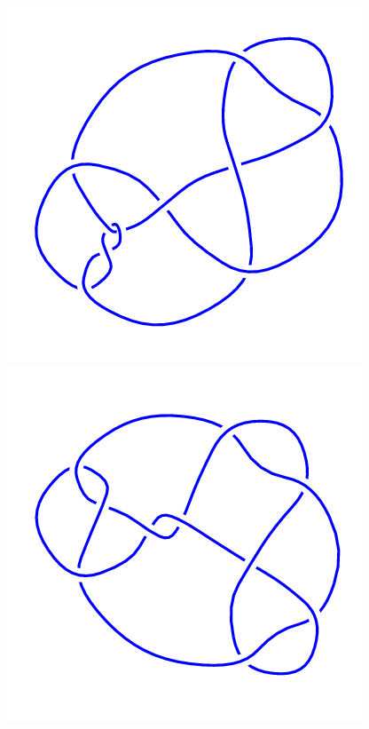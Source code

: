 \begin{figure}[H]
    \begin{minipage}[b]{.18\linewidth}
        \centering
        \includegraphics[width=\linewidth]{../data/10_42.png}
    \end{minipage}
    \begin{minipage}[b]{.18\linewidth}
        \centering
        \includegraphics[width=\linewidth]{../data/10_43.png}

\end{minipage}
\end{figure}
